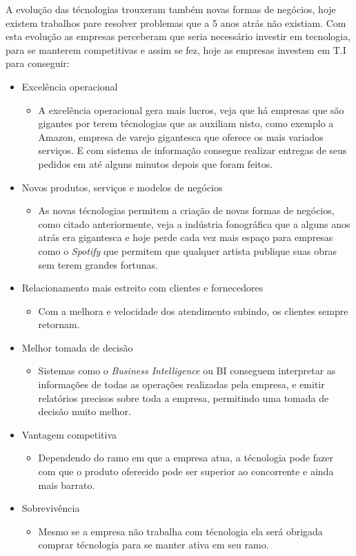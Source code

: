 \documentclass[
	12pt,				%
	openany,			%
	a4paper,			%
	chapter=TITLE,		%
	section=TITLE,		%
	english,
	brazil				%
]{abntex2}
\begin{document}
\begin{itemize}
A evolução das técnologias trouxeram também novas formas de negócios, hoje existem trabalhos pare resolver problemas que a 5 anos atrás não existiam. Com esta evolução as empresas perceberam que seria necessário investir em tecnologia, para se manterem competitivas e assim se fez, hoje as empresas investem em T.I para conseguir:
\begin{itemize}
	\item Excelência operacional
		\begin{itemize}
			\item A excelência operacional gera mais lucros, veja que há empresas que são gigantes por terem técnologias que as auxiliam nisto, como exemplo a Amazon, empresa de varejo gigantesca que oferece os mais variados serviços. E com sistema de informação consegue realizar entregas de seus pedidos em até alguns minutos depois que foram feitos.
		\end{itemize}
	\item Novos produtos, serviços e modelos de negócios
		\begin{itemize}
			\item As novas técnologias permitem a criação de novas formas de negócios, como citado anteriormente, veja a indústria fonográfica que a alguns anos atrás era gigantesca e hoje perde cada vez mais espaço para empresas como o \textit{Spotify} que permitem que qualquer artista publique suas obras sem terem grandes fortunas.
		\end{itemize}
	\item Relacionamento mais estreito com clientes e fornecedores
		\begin{itemize}
			\item Com a melhora e velocidade dos atendimento subindo, os clientes sempre retornam.
		\end{itemize}
	\item Melhor tomada de decisão
		\begin{itemize}
			\item Sistemas como o \textit{Business Intelligence} ou BI conseguem interpretar as informações de todas as operações realizadas pela empresa, e emitir relatórios precisos sobre toda a empresa, permitindo uma tomada de decisão muito melhor.
		\end{itemize}
	\item Vantagem competitiva
		\begin{itemize}
			\item Dependendo do ramo em que a empresa atua, a técnologia pode fazer com que o produto oferecido pode ser superior ao concorrente e ainda mais barrato.
		\end{itemize}
	\item Sobrevivência
		\begin{itemize}
			\item Mesmo se a empresa não trabalha com técnologia ela será obrigada comprar técnologia para se manter ativa em seu ramo.
		\end{itemize}
\end{itemize}



\end{itemize}
\end{document}
